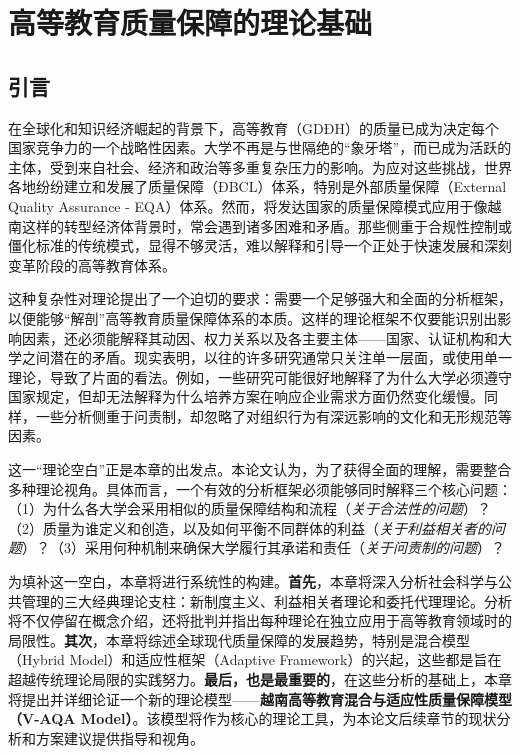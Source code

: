 

\chapter{高等教育质量保障的理论基础}
\label{chap:ly_luan}

\section*{引言}

在全球化和知识经济崛起的背景下，高等教育（GDĐH）的质量已成为决定每个国家竞争力的一个战略性因素。大学不再是与世隔绝的“象牙塔”，而已成为活跃的主体，受到来自社会、经济和政治等多重复杂压力的影响。为应对这些挑战，世界各地纷纷建立和发展了质量保障（ĐBCL）体系，特别是外部质量保障（External Quality Assurance - EQA）体系。然而，将发达国家的质量保障模式应用于像越南这样的转型经济体背景时，常会遇到诸多困难和矛盾。那些侧重于合规性控制或僵化标准的传统模式，显得不够灵活，难以解释和引导一个正处于快速发展和深刻变革阶段的高等教育体系。

这种复杂性对理论提出了一个迫切的要求：需要一个足够强大和全面的分析框架，以便能够“解剖”高等教育质量保障体系的本质。这样的理论框架不仅要能识别出影响因素，还必须能解释其动因、权力关系以及各主要主体——国家、认证机构和大学之间潜在的矛盾。现实表明，以往的许多研究通常只关注单一层面，或使用单一理论，导致了片面的看法。例如，一些研究可能很好地解释了为什么大学必须遵守国家规定，但却无法解释为什么培养方案在响应企业需求方面仍然变化缓慢。同样，一些分析侧重于问责制，却忽略了对组织行为有深远影响的文化和无形规范等因素。

这一“理论空白”正是本章的出发点。本论文认为，为了获得全面的理解，需要整合多种理论视角。具体而言，一个有效的分析框架必须能够同时解释三个核心问题：（1）为什么各大学会采用相似的质量保障结构和流程（\textit{关于合法性的问题}）？（2）质量为谁定义和创造，以及如何平衡不同群体的利益（\textit{关于利益相关者的问题}）？（3）采用何种机制来确保大学履行其承诺和责任（\textit{关于问责制的问题}）？

为填补这一空白，本章将进行系统性的构建。\textbf{首先}，本章将深入分析社会科学与公共管理的三大经典理论支柱：新制度主义、利益相关者理论和委托代理理论。分析将不仅停留在概念介绍，还将批判并指出每种理论在独立应用于高等教育领域时的局限性。\textbf{其次}，本章将综述全球现代质量保障的发展趋势，特别是混合模型（Hybrid Model）和适应性框架（Adaptive Framework）的兴起，这些都是旨在超越传统理论局限的实践努力。\textbf{最后，也是最重要的}，在这些分析的基础上，本章将提出并详细论证一个新的理论模型——\textbf{越南高等教育混合与适应性质量保障模型（V-AQA Model）}。该模型将作为核心的理论工具，为本论文后续章节的现状分析和方案建议提供指导和视角。


